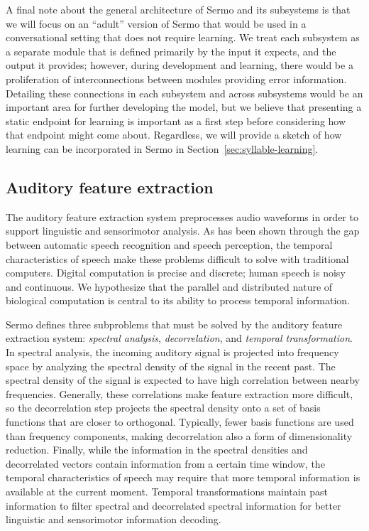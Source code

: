 A final note about
the general architecture of Sermo
and its subsystems
is that we will focus on an
``adult'' version of Sermo
that would be used in a conversational setting
that does not require learning.
We treat each subsystem as a separate
module that is defined primarily
by the input it expects,
and the output it provides;
however, during development
and learning,
there would be a proliferation of
interconnections between modules
providing error information.
Detailing these connections
in each subsystem and across subsystems
would be an important area
for further developing the model,
but we believe that presenting
a static endpoint for learning
is important as a first step
before considering
how that endpoint might come about.
Regardless, we will provide a sketch of
how learning can be incorporated in Sermo
in Section~\ref{sec:syllable-learning}.

\subsection{Auditory feature extraction}
\label{sec:model-ncc}


The auditory feature extraction system
preprocesses audio waveforms
in order to support
linguistic and sensorimotor analysis.
As has been shown through
the gap between
automatic speech recognition
and speech perception,
the temporal characteristics
of speech
make these problems
difficult to solve
with traditional computers.
Digital computation is precise and discrete;
human speech is noisy and continuous.
We hypothesize that the
parallel and distributed nature
of biological computation
is central to its
ability to process temporal information.

Sermo defines three subproblems
that must be solved
by the auditory feature extraction system:
\textit{spectral analysis},
\textit{decorrelation},
and \textit{temporal transformation}.
In spectral analysis,
the incoming auditory signal
is projected into frequency space
by analyzing the spectral density
of the signal in the recent past.
The spectral density of the signal
is expected to have high
correlation between nearby frequencies.
Generally, these correlations
make feature extraction more difficult,
so the decorrelation step
projects the spectral density
onto a set of basis functions
that are closer to orthogonal.
Typically, fewer basis functions
are used than frequency components,
making decorrelation also a form
of dimensionality reduction.
Finally, while the information
in the spectral densities
and decorrelated vectors
contain information from
a certain time window,
the temporal characteristics of speech
may require that more
temporal information is available
at the current moment.
Temporal transformations
maintain past information
to filter spectral
and decorrelated spectral information
for better linguistic
and sensorimotor information decoding.

